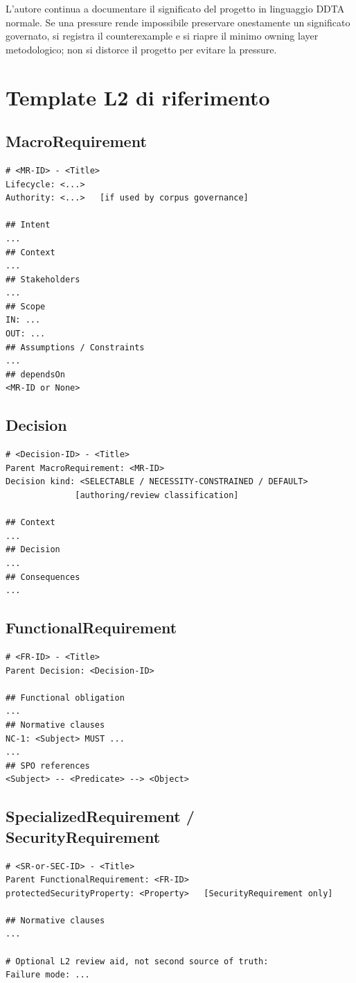 \documentclass[11pt,a4paper]{article}
\begin{document}
\begin{ddtacore}[title={Authoring response alle open pressure}]
L'autore continua a documentare il significato del progetto in linguaggio DDTA normale. Se una pressure rende impossibile preservare onestamente un significato governato, si registra il counterexample e si riapre il minimo owning layer metodologico; non si distorce il progetto per evitare la pressure.
\end{ddtacore}

\appendix
\section{Template L2 di riferimento}

\subsection{MacroRequirement}
\begin{lstlisting}
# <MR-ID> - <Title>
Lifecycle: <...>
Authority: <...>   [if used by corpus governance]

## Intent
...
## Context
...
## Stakeholders
...
## Scope
IN: ...
OUT: ...
## Assumptions / Constraints
...
## dependsOn
<MR-ID or None>
\end{lstlisting}

\subsection{Decision}
\begin{lstlisting}
# <Decision-ID> - <Title>
Parent MacroRequirement: <MR-ID>
Decision kind: <SELECTABLE / NECESSITY-CONSTRAINED / DEFAULT>
              [authoring/review classification]

## Context
...
## Decision
...
## Consequences
...
\end{lstlisting}

\subsection{FunctionalRequirement}
\begin{lstlisting}
# <FR-ID> - <Title>
Parent Decision: <Decision-ID>

## Functional obligation
...
## Normative clauses
NC-1: <Subject> MUST ...
...
## SPO references
<Subject> -- <Predicate> --> <Object>
\end{lstlisting}

\subsection{SpecializedRequirement / SecurityRequirement}
\begin{lstlisting}
# <SR-or-SEC-ID> - <Title>
Parent FunctionalRequirement: <FR-ID>
protectedSecurityProperty: <Property>   [SecurityRequirement only]

## Normative clauses
...

# Optional L2 review aid, not second source of truth:
Failure mode: ...
\end{lstlisting}
\end{document}

